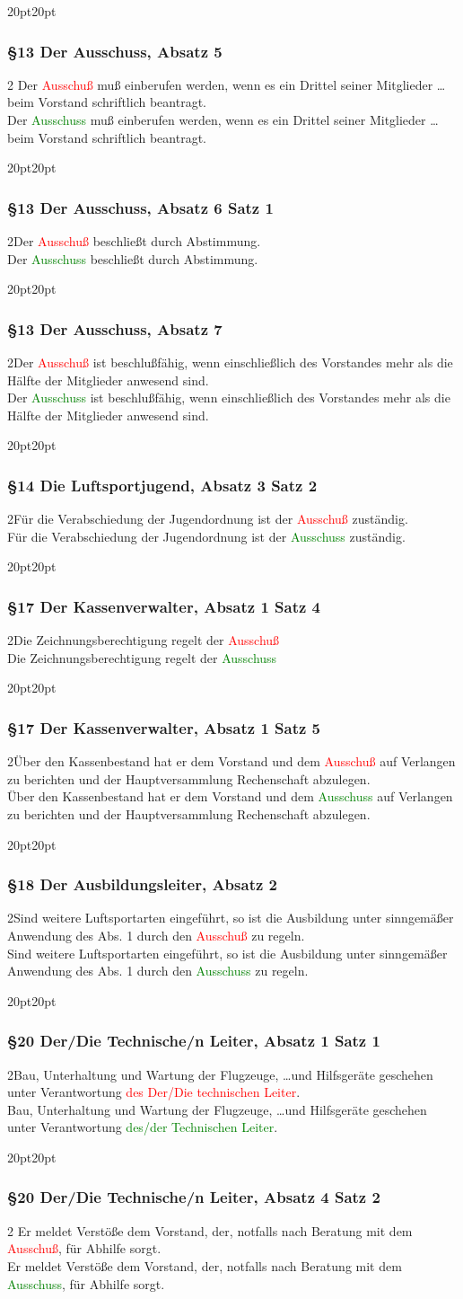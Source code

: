 \documentclass[10pt,a4paper,parskip=half]{scrartcl}
\newcommand{\new}[1]{\textcolor{Green}{#1}}
\newcommand{\old}[1]{\textcolor{Red}{#1}}
\newcommand{\change}[1]{
  \begin{adjustwidth}{20pt}{20pt}
    #1
  \end{adjustwidth}
}
\newcommand{\compare}[3]{\change{\subsubsection*{#1}\begin{multicols}{2}#2\columnbreak\\#3\end{multicols}}}
\begin{document}
\compare{§13 Der Ausschuss, Absatz 5}{
  Der \old{Ausschuß} muß einberufen werden,
  wenn es ein Drittel seiner Mitglieder \dots beim Vorstand schriftlich beantragt.
}
{Der \new{Ausschuss} muß einberufen werden,
  wenn es ein Drittel seiner Mitglieder \dots beim Vorstand schriftlich beantragt.}
\compare{§13 Der Ausschuss, Absatz 6 Satz 1}
{Der \old{Ausschuß} beschließt durch Abstimmung.}
{Der \new{Ausschuss} beschließt durch Abstimmung.}

\compare{§13 Der Ausschuss, Absatz 7}
{Der \old{Ausschuß} ist beschlußfähig, wenn einschließlich des Vorstandes mehr als die Hälfte der Mitglieder anwesend sind.}
{Der \new{Ausschuss} ist beschlußfähig, wenn einschließlich des Vorstandes mehr als die Hälfte der Mitglieder anwesend sind.}

\compare{§14 Die Luftsportjugend, Absatz 3 Satz 2}
{Für die Verabschiedung der Jugendordnung ist der \old{Ausschuß} zuständig.}
{Für die Verabschiedung der Jugendordnung ist der \new{Ausschuss} zuständig.}

\compare{§17  Der Kassenverwalter, Absatz 1 Satz 4}{Die Zeichnungsberechtigung regelt der \old{Ausschuß}}{Die Zeichnungsberechtigung regelt der \new{Ausschuss}}
\compare{§17 Der Kassenverwalter, Absatz 1 Satz 5}{Über den Kassenbestand hat er dem Vorstand und dem \old{Ausschuß} auf Verlangen zu berichten und der Hauptversammlung Rechenschaft abzulegen.}{Über den Kassenbestand hat er dem Vorstand und dem \new{Ausschuss} auf Verlangen zu berichten und der Hauptversammlung Rechenschaft abzulegen.}

\compare{§18 Der Ausbildungsleiter, Absatz 2}{Sind weitere Luftsportarten eingeführt, so ist die Ausbildung unter sinngemäßer Anwendung des
  Abs. 1 durch den \old{Ausschuß} zu regeln.}{Sind weitere Luftsportarten eingeführt, so ist die Ausbildung unter sinngemäßer Anwendung des
  Abs. 1 durch den \new{Ausschuss} zu regeln.}

\compare{§20 Der/Die Technische/n Leiter, Absatz 1 Satz 1}
{Bau, Unterhaltung und Wartung der Flugzeuge, \dots und Hilfsgeräte geschehen unter Verantwortung \old{des Der/Die technischen Leiter}.}
{Bau, Unterhaltung und Wartung der Flugzeuge, \dots und Hilfsgeräte geschehen unter Verantwortung \new{des/der Technischen Leiter}.}

\compare{§20 Der/Die Technische/n Leiter, Absatz 4 Satz 2}{
  Er meldet Verstöße dem Vorstand, der, notfalls nach Beratung mit dem \old{Ausschuß}, für Abhilfe sorgt.
}{
  Er meldet Verstöße dem Vorstand, der, notfalls nach Beratung mit dem \new{Ausschuss}, für Abhilfe sorgt.
}
\end{document}
